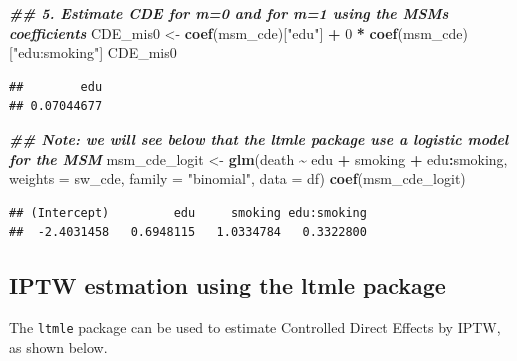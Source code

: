 \documentclass[
]{book}
\newenvironment{Shaded}{\begin{snugshade}}{\end{snugshade}}
\newcommand{\AttributeTok}[1]{\textcolor[rgb]{0.13,0.29,0.53}{#1}}
\newcommand{\DecValTok}[1]{\textcolor[rgb]{0.00,0.00,0.81}{#1}}
\newcommand{\DocumentationTok}[1]{\textcolor[rgb]{0.56,0.35,0.01}{\textbf{\textit{#1}}}}
\newcommand{\FunctionTok}[1]{\textcolor[rgb]{0.13,0.29,0.53}{\textbf{#1}}}
\newcommand{\NormalTok}[1]{#1}
\newcommand{\OtherTok}[1]{\textcolor[rgb]{0.56,0.35,0.01}{#1}}
\newcommand{\SpecialCharTok}[1]{\textcolor[rgb]{0.81,0.36,0.00}{\textbf{#1}}}
\newcommand{\StringTok}[1]{\textcolor[rgb]{0.31,0.60,0.02}{#1}}
\begin{document}
\begin{Shaded}
\begin{Highlighting}[]
\DocumentationTok{\#\# 5. Estimate CDE for m=0 and for m=1 using the MSM\textquotesingle{}s coefficients}
\NormalTok{CDE\_mis0 }\OtherTok{\textless{}{-}} \FunctionTok{coef}\NormalTok{(msm\_cde)[}\StringTok{"edu"}\NormalTok{] }\SpecialCharTok{+} \DecValTok{0} \SpecialCharTok{*} \FunctionTok{coef}\NormalTok{(msm\_cde)[}\StringTok{"edu:smoking"}\NormalTok{]}
\NormalTok{CDE\_mis0}
\end{Highlighting}
\end{Shaded}

\begin{verbatim}
##        edu 
## 0.07044677
\end{verbatim}

\begin{Shaded}
\begin{Highlighting}[]
\DocumentationTok{\#\# Note: we will see below that the ltmle package use a logistic model for the MSM}
\NormalTok{msm\_cde\_logit }\OtherTok{\textless{}{-}} \FunctionTok{glm}\NormalTok{(death }\SpecialCharTok{\textasciitilde{}}\NormalTok{ edu }\SpecialCharTok{+}\NormalTok{ smoking }\SpecialCharTok{+}\NormalTok{ edu}\SpecialCharTok{:}\NormalTok{smoking,}
                     \AttributeTok{weights =}\NormalTok{ sw\_cde,}
                     \AttributeTok{family =} \StringTok{"binomial"}\NormalTok{,}
                     \AttributeTok{data =}\NormalTok{ df)}
\FunctionTok{coef}\NormalTok{(msm\_cde\_logit)}
\end{Highlighting}
\end{Shaded}

\begin{verbatim}
## (Intercept)         edu     smoking edu:smoking 
##  -2.4031458   0.6948115   1.0334784   0.3322800
\end{verbatim}

\subsection{IPTW estmation using the ltmle package}\label{iptw-estmation-using-the-ltmle-package}

The \texttt{ltmle} package can be used to estimate Controlled Direct Effects by IPTW, as shown below.
\end{document}
